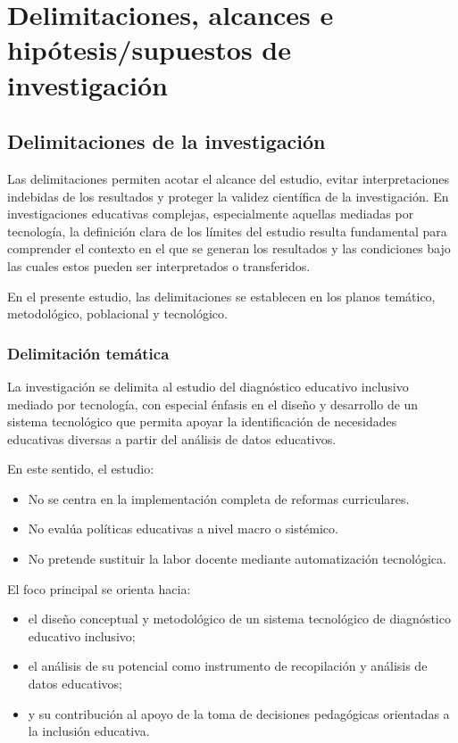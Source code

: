 \chapter{Delimitaciones, alcances e hipótesis/supuestos de investigación}

\begin{refsection}


\section{Delimitaciones de la investigación}

Las delimitaciones permiten acotar el alcance del estudio, evitar interpretaciones indebidas de los resultados y proteger la validez científica de la investigación. En investigaciones educativas complejas, especialmente aquellas mediadas por tecnología, la definición clara de los límites del estudio resulta fundamental para comprender el contexto en el que se generan los resultados y las condiciones bajo las cuales estos pueden ser interpretados o transferidos.

En el presente estudio, las delimitaciones se establecen en los planos temático, metodológico, poblacional y tecnológico.

\subsection{Delimitación temática}

La investigación se delimita al estudio del diagnóstico educativo inclusivo mediado por tecnología, con especial énfasis en el diseño y desarrollo de un sistema tecnológico que permita apoyar la identificación de necesidades educativas diversas a partir del análisis de datos educativos.

En este sentido, el estudio:

\begin{itemize}
\item No se centra en la implementación completa de reformas curriculares.
\item No evalúa políticas educativas a nivel macro o sistémico.
\item No pretende sustituir la labor docente mediante automatización tecnológica.
\end{itemize}

El foco principal se orienta hacia:

\begin{itemize}
\item el diseño conceptual y metodológico de un sistema tecnológico de diagnóstico educativo inclusivo;
\item el análisis de su potencial como instrumento de recopilación y análisis de datos educativos;
\item y su contribución al apoyo de la toma de decisiones pedagógicas orientadas a la inclusión educativa.
\end{itemize}


\end{refsection}
